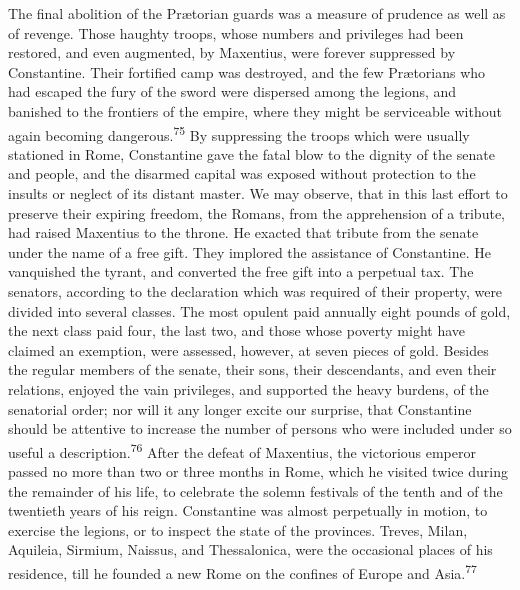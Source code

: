 The final abolition of the Prætorian guards was a measure of
prudence as well as of revenge. Those haughty troops, whose
numbers and privileges had been restored, and even augmented, by
Maxentius, were forever suppressed by Constantine. Their
fortified camp was destroyed, and the few Prætorians who had
escaped the fury of the sword were dispersed among the legions,
and banished to the frontiers of the empire, where they might be
serviceable without again becoming dangerous.\textsuperscript{75} By suppressing
the troops which were usually stationed in Rome, Constantine gave
the fatal blow to the dignity of the senate and people, and the
disarmed capital was exposed without protection to the insults or
neglect of its distant master. We may observe, that in this last
effort to preserve their expiring freedom, the Romans, from the
apprehension of a tribute, had raised Maxentius to the throne. He
exacted that tribute from the senate under the name of a free
gift. They implored the assistance of Constantine. He vanquished
the tyrant, and converted the free gift into a perpetual tax. The
senators, according to the declaration which was required of
their property, were divided into several classes. The most
opulent paid annually eight pounds of gold, the next class paid
four, the last two, and those whose poverty might have claimed an
exemption, were assessed, however, at seven pieces of gold.
Besides the regular members of the senate, their sons, their
descendants, and even their relations, enjoyed the vain
privileges, and supported the heavy burdens, of the senatorial
order; nor will it any longer excite our surprise, that
Constantine should be attentive to increase the number of persons
who were included under so useful a description.\textsuperscript{76} After the
defeat of Maxentius, the victorious emperor passed no more than
two or three months in Rome, which he visited twice during the
remainder of his life, to celebrate the solemn festivals of the
tenth and of the twentieth years of his reign. Constantine was
almost perpetually in motion, to exercise the legions, or to
inspect the state of the provinces. Treves, Milan, Aquileia,
Sirmium, Naissus, and Thessalonica, were the occasional places of
his residence, till he founded a new Rome on the confines of
Europe and Asia.\textsuperscript{77}



